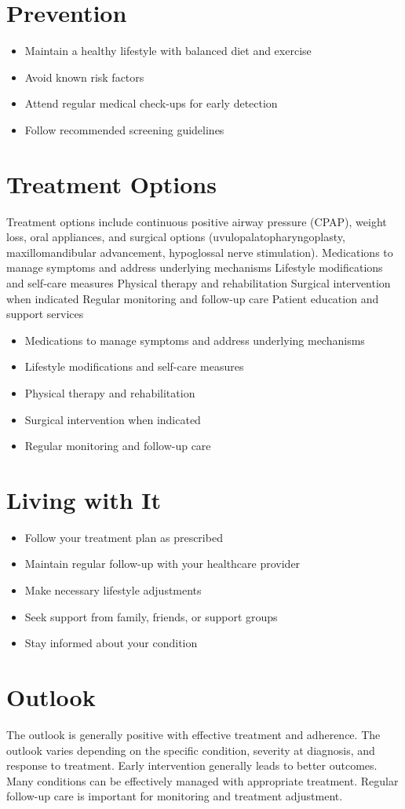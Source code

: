 \section{Prevention}
\begin{itemize}[noitemsep]
  \item Maintain a healthy lifestyle with balanced diet and exercise
  \item Avoid known risk factors
  \item Attend regular medical check-ups for early detection
  \item Follow recommended screening guidelines
\end{itemize}
\section{Treatment Options}
Treatment options include continuous positive airway pressure (CPAP), weight loss, oral appliances, and surgical options (uvulopalatopharyngoplasty, maxillomandibular advancement, hypoglossal nerve stimulation). Medications to manage symptoms and address underlying mechanisms Lifestyle modifications and self-care measures Physical therapy and rehabilitation Surgical intervention when indicated Regular monitoring and follow-up care Patient education and support services

\begin{itemize}[noitemsep]
  \item Medications to manage symptoms and address underlying mechanisms
  \item Lifestyle modifications and self-care measures
  \item Physical therapy and rehabilitation
  \item Surgical intervention when indicated
  \item Regular monitoring and follow-up care
\end{itemize}
\section{Living with It}
\begin{itemize}[noitemsep]
  \item Follow your treatment plan as prescribed
  \item Maintain regular follow-up with your healthcare provider
  \item Make necessary lifestyle adjustments
  \item Seek support from family, friends, or support groups
  \item Stay informed about your condition
\end{itemize}
\section{Outlook}
The outlook is generally positive with effective treatment and adherence. The outlook varies depending on the specific condition, severity at diagnosis, and response to treatment. Early intervention generally leads to better outcomes. Many conditions can be effectively managed with appropriate treatment. Regular follow-up care is important for monitoring and treatment adjustment.

